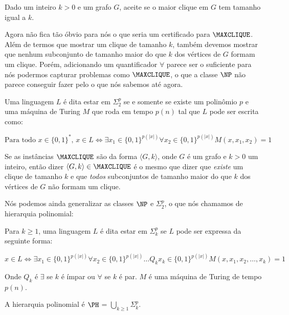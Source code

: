 \begin{maxclique}

Dado um inteiro $k > 0$ e um grafo $G$, aceite se o maior clique em $G$ tem tamanho igual a $k$.

\end{maxclique}

Agora não fica tão óbvio para nós o que seria um certificado para $\MAXCLIQUE$. Além de termos que mostrar um clique de tamanho $k$, também devemos mostrar que nenhum subconjunto de tamanho maior do que $k$ dos vértices de $G$ formam um clique. Porém, adicionando um quantificador $\forall$ parece ser o suficiente para nós podermos capturar problemas como $\MAXCLIQUE$, o que a classe $\NP$ não parece conseguir fazer pelo o que nós sabemos até agora.

\begin{defi} 

Uma linguagem $L$ é dita estar em $\Sigma_{2}^{p}$ se e somente se existe um polinômio $p$ e uma máquina de Turing $M$ que roda em tempo $p(n)$ tal que $L$ pode ser escrita como:

\begin{equation*}
    \text{Para todo } x \in \{0, 1\}^{*} \text{, } x \in L \iff \exists x_{1} \in \{0, 1\}^{p(\lvert x \rvert)} \forall x_{2} \in \{0, 1\}^{p(\lvert x \rvert)} M(x, x_{1}, x_{2}) = 1
\end{equation*}

\end{defi}

Se as instâncias $\MAXCLIQUE$ são da forma $\langle G, k \rangle$, onde $G$ é um grafo e $k > 0$ um inteiro, então dizer $\langle G, k \rangle \in \MAXCLIQUE$ é o mesmo que dizer que \emph{existe} um clique de tamanho $k$ e que \emph{todos} subconjuntos de tamanho maior do que $k$ dos vértices de $G$ não formam um clique.

Nós podemos ainda generalizar as classes $\NP$ e $\Sigma_{2}^{p}$, o que nós chamamos de hierarquia polinomial:

\begin{defi}  \label{defi: PH}

Para $k \geq 1$, uma linguagem $L$ é dita estar em $\Sigma_{k}^{p}$ se $L$ pode ser expressa da seguinte forma:

\begin{equation*}
    x \in L \iff \exists x_{1} \in \{0, 1\}^{p(\lvert x \rvert)} \forall x_{2} \in \{0, 1\}^{p(\lvert x \rvert)} \dots Q_{k} x_{k} \in \{0, 1\}^{p(\lvert x \rvert)} M(x, x_{1}, x_{2}, \dots, x_{k}) = 1
\end{equation*}

Onde $Q_{k}$ é $\exists$ se $k$ é ímpar ou $\forall$ se $k$ é par. $M$ é uma máquina de Turing de tempo $p(n)$.

A hierarquia polinomial é $\PH$ = $\bigcup_{k \geq 1} \Sigma_{k}^{p}$.

\end{defi}

